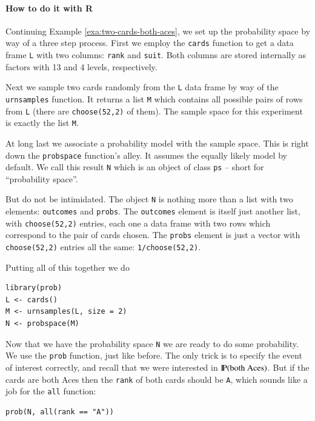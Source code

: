 \documentclass[captions=tableheading]{scrbook}
\begin{document}
\paragraph*{How to do it with \textsf{R}}
\label{sub:howto-ps-objects}

Continuing Example \ref{exa:two-cards-both-aces}, we set up the probability space by way of a three step process. First we employ the \texttt{cards} function to get a data frame \texttt{L} with two columns: \texttt{rank} and \texttt{suit}. Both columns are stored internally as factors with 13 and 4 levels, respectively.

Next we sample two cards randomly from the \texttt{L} data frame by way of the \texttt{urnsamples} function. It returns a list \texttt{M} which contains all possible pairs of rows from \texttt{L} (there are \texttt{choose(52,2)} of them). The sample space for this experiment is exactly the list \texttt{M}.

At long last we associate a probability model with the sample space. This is right down the \texttt{probspace} function's alley. It assumes the equally likely model by default. We call this result \texttt{N} which is an object of class \texttt{ps} -- short for ``probability space''.

But do not be intimidated. The object \texttt{N} is nothing more than a list with two elements: \texttt{outcomes} and \texttt{probs}. The \texttt{outcomes} element is itself just another list, with \texttt{choose(52,2)} entries, each one a data frame with two rows which correspond to the pair of cards chosen. The \texttt{probs} element is just a vector with \texttt{choose(52,2)} entries all the same: \texttt{1/choose(52,2)}.

Putting all of this together we do 


\begin{verbatim}
library(prob)
L <- cards()
M <- urnsamples(L, size = 2)
N <- probspace(M)
\end{verbatim}

Now that we have the probability space \texttt{N} we are ready to do some probability. We use the \texttt{prob} function, just like before. The only trick is to specify the event of interest correctly, and recall that we were interested in \(\P(\mbox{both Aces})\). But if the cards are both Aces then the \texttt{rank} of both cards should be \texttt{A}, which sounds like a job for the \texttt{all} function:


\begin{verbatim}
prob(N, all(rank == "A"))
\end{verbatim}
\end{document}
